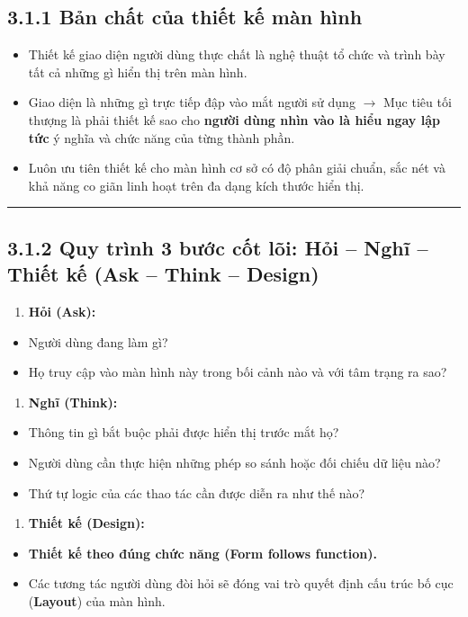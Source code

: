 \documentclass[11pt,a4paper,oneside]{report}
\begin{document}
\subsection{3.1.1 Bản chất của thiết kế màn hình}
\begin{itemize}[leftmargin=1.5em]
\item Thiết kế giao diện người dùng thực chất là nghệ thuật tổ chức và trình bày tất cả những gì hiển thị trên màn hình.
\item Giao diện là những gì trực tiếp đập vào mắt người sử dụng $\rightarrow$ Mục tiêu tối thượng là phải thiết kế sao cho \textbf{người dùng nhìn vào là hiểu ngay lập tức} ý nghĩa và chức năng của từng thành phần.
\item Luôn ưu tiên thiết kế cho màn hình cơ sở có độ phân giải chuẩn, sắc nét và khả năng co giãn linh hoạt trên đa dạng kích thước hiển thị.
\end{itemize}

\bigskip\hrule\bigskip

\subsection{3.1.2 Quy trình 3 bước cốt lõi: Hỏi – Nghĩ – Thiết kế (Ask – Think – Design)}
\begin{enumerate}[leftmargin=1.5em]
\item \textbf{Hỏi (Ask):}  
\end{enumerate}
\begin{itemize}[leftmargin=1.5em]
\item Người dùng đang làm gì?  
\item Họ truy cập vào màn hình này trong bối cảnh nào và với tâm trạng ra sao?
\end{itemize}
\begin{enumerate}[leftmargin=1.5em]
\item \textbf{Nghĩ (Think):}  
\end{enumerate}
\begin{itemize}[leftmargin=1.5em]
\item Thông tin gì bắt buộc phải được hiển thị trước mắt họ?  
\item Người dùng cần thực hiện những phép so sánh hoặc đối chiếu dữ liệu nào?  
\item Thứ tự logic của các thao tác cần được diễn ra như thế nào?
\end{itemize}
\begin{enumerate}[leftmargin=1.5em]
\item \textbf{Thiết kế (Design):}  
\end{enumerate}
\begin{itemize}[leftmargin=1.5em]
\item \textbf{Thiết kế theo đúng chức năng (Form follows function).}  
\item Các tương tác người dùng đòi hỏi sẽ đóng vai trò quyết định cấu trúc bố cục (\textbf{Layout}) của màn hình.
\end{itemize}
\end{document}
